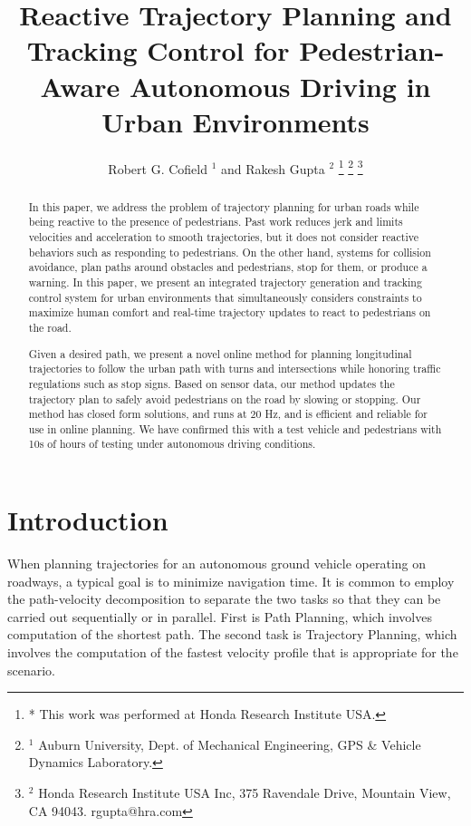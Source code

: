 \documentclass[letterpaper, 10 pt, conference]{ieeeconf}  %
\title{\LARGE \bf
  Reactive Trajectory Planning and Tracking Control for Pedestrian-Aware Autonomous Driving in Urban Environments
}
\author{
  Robert G. Cofield $^{1}$ and
  Rakesh Gupta $^{2}$
  \thanks{
    * This work was performed at Honda Research Institute USA.
  }
  \thanks{
    $^{1}$ Auburn University, Dept. of Mechanical Engineering, GPS \& Vehicle Dynamics Laboratory.
  }
  \thanks{
    $^{2}$ Honda Research Institute USA Inc, 375 Ravendale Drive, Mountain View, CA 94043. rgupta@hra.com
  }
}
\begin{document}
\maketitle
\thispagestyle{empty}
\pagestyle{empty}

\begin{abstract}

In this paper, we address the problem of trajectory planning for urban roads while being 
reactive to the presence of pedestrians.
Past work reduces jerk and limits velocities and acceleration to smooth trajectories, but it does not consider 
reactive behaviors such as responding to pedestrians. On the other hand, systems for collision 
avoidance, plan paths around obstacles and pedestrians, stop for them, or produce a warning. 
In this paper, we present an integrated trajectory generation and tracking control system for urban 
environments that simultaneously considers constraints to maximize human comfort and real-time  
trajectory updates to react to pedestrians on the road. 

Given a desired path, we present a novel online method for planning longitudinal trajectories 
to follow the urban path with turns and intersections while honoring traffic regulations such 
as stop signs. Based on sensor data, our method updates the trajectory plan to safely avoid 
pedestrians on the road by slowing or stopping.
Our method has closed form solutions, and runs at 20 Hz, and is efficient and reliable 
for use in online planning. We have confirmed this with
a test vehicle and pedestrians with 10s of hours of testing under autonomous driving conditions.

\end{abstract}

\section{Introduction} \label{sec:introduction}

When planning trajectories for an autonomous ground vehicle operating on roadways, a typical goal is to minimize navigation time.
It is common to employ the path-velocity decomposition to separate the two tasks so that they can be carried out sequentially or in parallel.
First is Path Planning, which involves computation of the shortest path.
The second task is Trajectory Planning, which involves the computation of the fastest velocity profile that is appropriate for the scenario.
\end{document}
